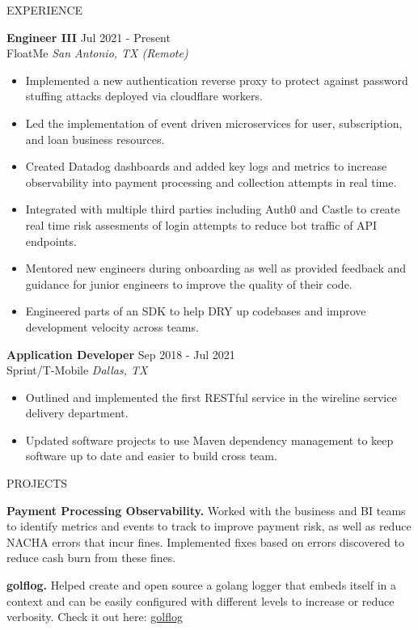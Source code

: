 \documentclass{resume} %
\begin{document}
\begin{rSection}{EXPERIENCE}

\textbf{Engineer III} \hfill Jul 2021 - Present\\
FloatMe \hfill \textit{San Antonio, TX (Remote)}
 \begin{itemize}
    \itemsep -3pt {}
     \item Implemented a new authentication reverse proxy to protect against password stuffing attacks deployed via cloudflare workers.
     \item Led the implementation of event driven microservices for user, subscription, and loan business resources.
    \item Created Datadog dashboards and added key logs and metrics to increase observability into payment processing and collection attempts in real time.
    \item Integrated with multiple third parties including Auth0 and Castle to create real time risk assesments of login attempts to reduce bot traffic of API endpoints.
    \item Mentored new engineers during onboarding as well as provided feedback and guidance for junior engineers to improve the quality of their code.
    \item Engineered parts of an SDK to help DRY up codebases and improve development velocity across teams.
 \end{itemize}

\textbf{Application Developer} \hfill Sep 2018 - Jul 2021\\
Sprint/T-Mobile \hfill \textit{Dallas, TX}
 \begin{itemize}
    \itemsep -3pt {}
     \item Outlined and implemented the first RESTful service in the wireline service delivery department.
     \item Updated software projects to use Maven dependency management to keep software up to date and easier to build cross team.
 \end{itemize}

\end{rSection}


\begin{rSection}{PROJECTS}
\vspace{-1.25em}
\item \textbf{Payment Processing Observability.} {Worked with the business and BI teams to identify metrics and events to track to improve payment risk, as well as reduce NACHA errors that incur fines. Implemented fixes based on errors discovered to reduce cash burn from these fines.}
\item \textbf{golflog.} {Helped create and open source a golang logger that embeds itself in a context and can be easily configured with different levels to increase or reduce verbosity. Check it out here: \href{https://github.com/floatme-corp/golflog}{golflog}}
\end{rSection}
\end{document}
